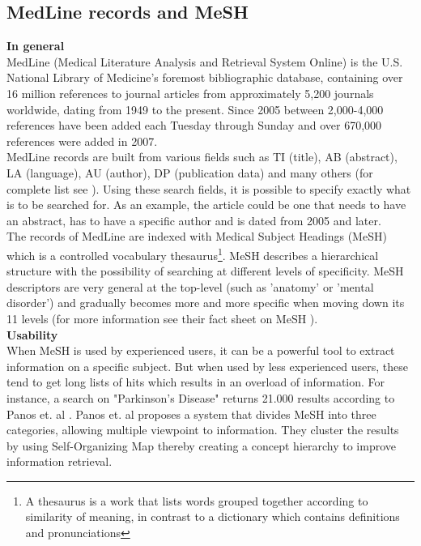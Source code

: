 \subsection{MedLine records and MeSH\label{MedLine_records_MeSH}}

\textbf{In general} \\
MedLine (Medical Literature Analysis and Retrieval System Online)
\cite{PubMedFactSheetMedline} is the U.S. National Library of
Medicine's foremost bibliographic database, containing over 16 million
references to journal articles from approximately 5,200 journals
worldwide, dating from 1949 to the present. Since 2005 between
2,000-4,000 references have been added each Tuesday through Sunday and
over 670,000 references were added in 2007.\\

MedLine records are built from various fields such as TI (title), AB
(abstract), LA (language), AU (author), DP (publication data) and many
others (for complete list see \cite{PubMedHelpSearchFieldDescriptionsTags}). Using these
search fields, it is possible to specify exactly what is to be
searched for. As an example, the article could be one that needs to
have an abstract, has to have a specific author and is dated from 2005
and later.\\

The records of MedLine are indexed with Medical Subject Headings
(MeSH) which is a controlled vocabulary thesaurus\footnote{A
  thesaurus is a work that lists words grouped together according to
  similarity of meaning, in contrast to a dictionary which contains
  definitions and pronunciations}. MeSH describes a hierarchical
structure with the possibility of searching at different levels of
specificity. MeSH descriptors are very general at the top-level (such
as 'anatomy' or 'mental disorder') and gradually becomes more and more
specific when moving down its 11 levels (for more information see
their fact sheet on MeSH \cite{FactSheetMeSH}).\\

\textbf{Usability} \\ When MeSH is used by experienced users, it can
be a powerful tool to extract information on a specific subject. But
when used by less experienced users, these tend to get long lists of
hits which results in an overload of information. For instance, a
search on "Parkinson's Disease" returns 21.000 results according to
Panos et. al \cite{DataMiningBiomedicine}. Panos et. al
\cite{DataMiningBiomedicine} proposes a system that divides MeSH into
three categories, allowing multiple viewpoint to information. They
cluster the results by using Self-Organizing Map thereby creating a
concept hierarchy to improve information retrieval.\\

